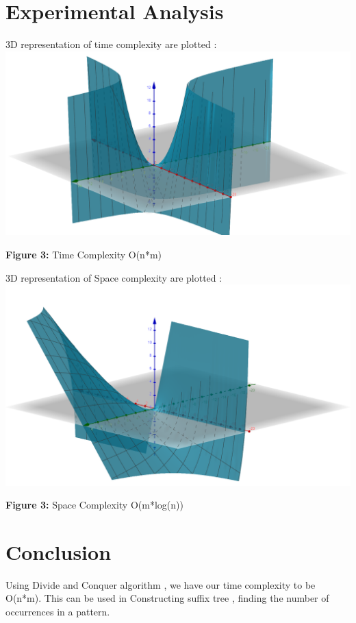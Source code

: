 \documentclass{article}
\begin{document}
\begin{multicols}{2}
\section{Experimental Analysis}
3D representation of time complexity are plotted :\newline
\includegraphics[scale=0.20]{time_plot.png}
\begin{center}\textbf{Figure 3:} Time Complexity O(n*m)\end{center}

3D representation of Space complexity are plotted :\newline
\includegraphics[scale=0.20]{space_plot.png}
\begin{center}\textbf{Figure 3:} Space Complexity O(m*log(n))\end{center}

\section{Conclusion}
Using Divide and Conquer algorithm , we have our time complexity to be O(n*m).\newline
This can be used in Constructing suffix tree , finding the number of occurrences in a pattern.


\end{multicols}
\end{document}
